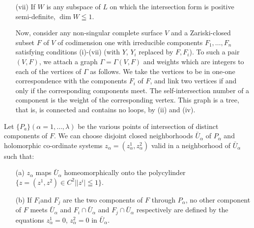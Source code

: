 \begin{itemize}
\item[(vii)] If $W$ is any subspace of $L$ on which the intersection form is positive semi-definite, $\dim W \leqq 1$.

Now, consider any non-singular complete surface $V$ and a Zariski-closed subset $F$ of $V$ of codimension one with irreducible components $F_1, \ldots , F_n$ satisfying conditions (i)-(vii) (with $Y$, $Y_i$ replaced by $F, F_i$). To such a pair $(V,F)$, we attach a graph $\Gamma = \Gamma (V, F)$ and weights which are integers to each of the vertices of $\Gamma$ as follows. We take the vertices to be in one-one correspondence with the components $F_i$ of $F$, and link two vertices if and only if the corresponding components meet. The self-intersection number of a component is the weight of the corresponding vertex. This graph is a tree, that is, is connected and contains no loops, by (ii) and (iv).
\end{itemize}

Let $\{P_a\} (\alpha =1 , \ldots, \lambda)$ be the various points of intersection of distinct components of $F$. We can choose disjoint closed neighborhoods $\bar{U}_\alpha$ of $P_\alpha$ and holomorphic co-ordinate systems $z_\alpha = (z^1_\alpha, z^2_\alpha)$ valid in a neighborhood of $\bar{U}_\alpha$ such that:
\begin{itemize}
\item[(a)] $z_\alpha$ maps $\bar{U}_\alpha$ homeomorphically onto the polycylinder $\{z = (z^1, z^2) \in C^2 || z^i| \leqq 1 \}$.

\item[(b)] If $F_i$\pageoriginale and $F_j$ are the two components of $F$ through $P_\alpha$, no other component of $F$ meets $\bar{U}_\alpha$ and $F_i \cap \bar{U}_\alpha$ and $F_j \cap \bar{U}_\alpha$ respectively are defined by the equations $z^1_\alpha =0$, $z^2_\alpha = 0$ in $\bar{U}_\alpha$.
\end{itemize}

